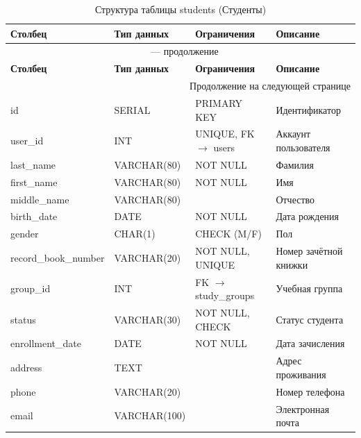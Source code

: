\documentclass[14pt, a4paper]{extreport}
\begin{document}
\begin{longtable}{p{3cm} p{3cm} p{4cm} p{4.5cm}}
\caption{Структура таблицы students (Студенты)} \\
\toprule
\textbf{Столбец} & \textbf{Тип данных} & \textbf{Ограничения} & \textbf{Описание} \\
\midrule
\endfirsthead
\multicolumn{4}{c}{{\tablename\ \thetable{} --- продолжение}} \\
\toprule
\textbf{Столбец} & \textbf{Тип данных} & \textbf{Ограничения} & \textbf{Описание} \\
\midrule
\endhead
\midrule
\multicolumn{4}{r}{{Продолжение на следующей странице}} \\
\endfoot
\bottomrule
\endlastfoot
id & SERIAL & PRIMARY KEY & Идентификатор \\
user\_id & INT & UNIQUE, FK $\rightarrow$ users & Аккаунт пользователя \\
last\_name & VARCHAR(80) & NOT NULL & Фамилия \\
first\_name & VARCHAR(80) & NOT NULL & Имя \\
middle\_name & VARCHAR(80) & & Отчество \\
birth\_date & DATE & NOT NULL & Дата рождения \\
gender & CHAR(1) & CHECK (M/F) & Пол \\
record\_book\_number & VARCHAR(20) & NOT NULL, UNIQUE & Номер зачётной книжки \\
group\_id & INT & FK $\rightarrow$ study\_groups & Учебная группа \\
status & VARCHAR(30) & NOT NULL, CHECK & Статус студента \\
enrollment\_date & DATE & NOT NULL & Дата зачисления \\
address & TEXT & & Адрес проживания \\
phone & VARCHAR(20) & & Номер телефона \\
email & VARCHAR(100) & & Электронная почта \\
\end{longtable}
\end{document}
